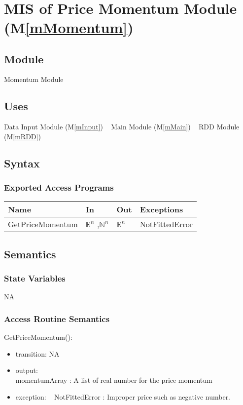 \documentclass[12pt, titlepage]{article}
\newcommand{\mref}[1]{M\ref{#1}}
\begin{document}
~\newpage

\section{MIS of Price Momentum Module (\mref{mMomentum}) } 

\subsection{Module}
Momentum Module
\subsection{Uses}
Data Input Module (\mref{mInput})
~\newline
Main Module (\mref{mMain})
~\newline
RDD Module (\mref{mRDD})
\subsection{Syntax}


\subsubsection{Exported Access Programs}

\begin{center}
\begin{tabular}{p{4cm} p{2cm} p{2cm} p{4cm}}
\hline
\textbf{Name} & \textbf{In} & \textbf{Out} & \textbf{Exceptions} \\
\hline

GetPriceMomentum & $\mathbb{R}^n$ ,$\mathbb{N}^n$ & $\mathbb{R}^n$ & NotFittedError \\
\hline
\end{tabular}
\end{center}

\subsection{Semantics}
\subsubsection{State Variables}
NA

\subsubsection{Access Routine Semantics}

\noindent GetPriceMomentum():
\begin{itemize}
\item transition: NA
\item output:\\
momentumArray : A list of real number for the price momentum
\item exception:
~\newline
NotFittedError : Improper price such as negative number.
\end{itemize}
\end{document}
